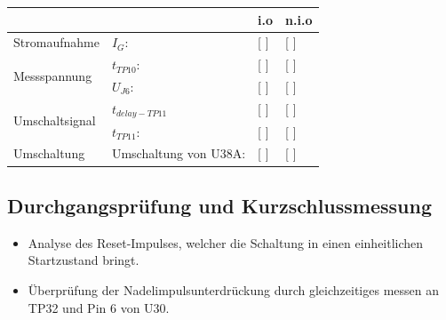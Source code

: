 \documentclass[a4paper,11pt]{scrartcl}
\begin{document}

\renewcommand{\arraystretch}{2}
\begin{tabularx}{\textwidth}{p{}| p{} | p{} | p{}}

 &  & i.o & n.i.o \\

\hline

Stromaufnahme & $I_{G}$: & [ ] & [ ] \\

\hline

\multirow{2}{*}{Messspannung}
		& $t_{TP10}$:						& [ ] & [ ] \\
		& $U_{J6}$: 						& [ ] & [ ] \\

\hline

\multirow{2}{*}{Umschaltsignal}
		& $t_{delay-TP11}$	 				& [ ] & [ ] \\
		& $t_{TP11}$:						& [ ] & [ ] \\

\hline

Umschaltung & Umschaltung von U38A:	& [ ] & [ ] \\
		
\end{tabularx}
\renewcommand{\arraystretch}{1}


\subsection{Durchgangsprüfung und Kurzschlussmessung}


\begin{itemize}
	\item{Analyse des Reset-Impulses, welcher die Schaltung in einen einheitlichen Startzustand bringt.}
	
	\item{Überprüfung der Nadelimpulsunterdrückung durch gleichzeitiges messen an TP32 und Pin 6 von U30.}
\end{itemize}
\end{document}
